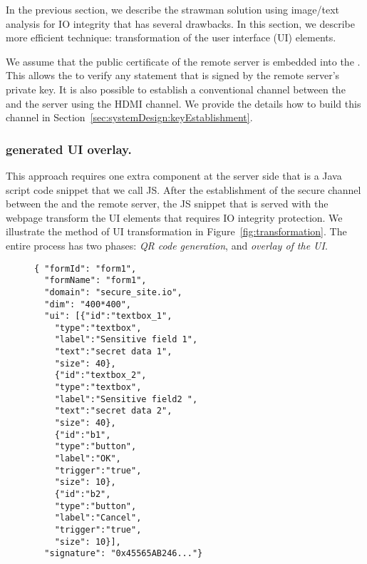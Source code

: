 In the previous section, we describe the strawman solution using image/text analysis for IO integrity that has several drawbacks. In this section, we describe more efficient technique: transformation of the user interface (UI) elements.

We assume that the public certificate of the remote server is embedded into the \device. This allows the \device to verify any statement that is signed by the remote server's private key. It is also possible to establish a conventional \tls channel between the \device and the server using the HDMI channel. We provide the details how to build this \tls channel in Section~\ref{sec:systemDesign:keyEstablishment}.

\subsubsection{\device generated UI overlay.} \label{sec:systemDesign:transformation:overlay} This approach requires one extra component at the server side that is a Java script code snippet that we call \name JS. After the establishment of the secure channel between the \device and the remote server, the \name JS snippet that is served with the webpage transform the UI elements that requires IO integrity protection. We illustrate the method of UI transformation in Figure~\ref{fig:transformation}. The entire process has two phases: \emph{QR code generation}, and \emph{overlay of the UI}.



\begin{figure}[t]
\begin{lstlisting}[mathescape=true]
{ "formId": "form1",
  "formName": "form1",
  "domain": "secure_site.io",
  "dim": "400*400",
  "ui": [{"id":"textbox_1",
  	"type":"textbox",
	"label":"Sensitive field 1",
	"text":"secret data 1",
	"size": 40},
	{"id":"textbox_2",
	"type":"textbox",
	"label":"Sensitive field2 ",
	"text":"secret data 2",
	"size": 40},
	{"id":"b1",
	"type":"button",
	"label":"OK",
	"trigger":"true",
	"size": 10},	
	{"id":"b2",
	"type":"button",
	"label":"Cancel",
	"trigger":"true",
	"size": 10}],
  "signature": "0x45565AB246..."}
\end{lstlisting}
\end{figure}

